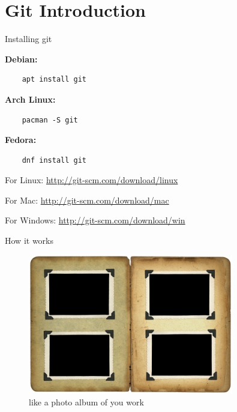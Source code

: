 \section{Git Introduction}

\begin{frame}[fragile]{Installing git}

    \textbf{Debian:}
    \begin{lstlisting}
    apt install git
    \end{lstlisting}

    \textbf{Arch Linux:}
    \begin{lstlisting}
    pacman -S git
    \end{lstlisting}

    \textbf{Fedora:}
    \begin{lstlisting}
    dnf install git
    \end{lstlisting}

    \begin{description}
        \item{For Linux:} \url{http://git-scm.com/download/linux}
        \item{For Mac:} \url{http://git-scm.com/download/mac}
        \item{For Windows:} \url{http://git-scm.com/download/win}
    \end{description}

\end{frame}

\begin{frame}[fragile]{How it works}
    \begin{figure}
        \centering
        \includegraphics[width=0.8\textwidth]{img/photo_album.jpg}
        \caption{like a photo album of you work}
    \end{figure}
\end{frame}

